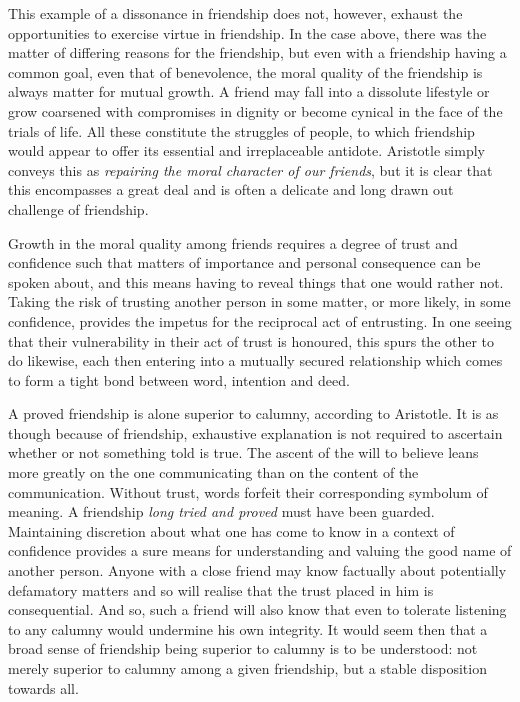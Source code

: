 \documentclass[a4paper,10pt]{article}
\begin{document}
This example of a dissonance in friendship does not, however, exhaust the opportunities to exercise virtue in friendship. In the case above, there was the matter of differing reasons for the friendship, but even with a friendship having a common goal, even that of benevolence, the moral quality of the friendship is always matter for mutual growth. A friend may fall into a dissolute lifestyle or grow coarsened with compromises in dignity or become cynical in the face of the trials of life. All these constitute the struggles of people, to which friendship would appear to offer its essential and irreplaceable antidote. Aristotle simply conveys this as \emph{repairing the moral character of our friends}, but it is clear that this encompasses a great deal and is often a delicate and long drawn out challenge of friendship.

Growth in the moral quality among friends requires a degree of trust and confidence such that matters of importance and personal consequence can be spoken about, and this means having to reveal things that one would rather not. Taking the risk of trusting another person in some matter, or more likely, in some confidence, provides the impetus for the reciprocal act of entrusting. In one seeing that their vulnerability in their act of trust is honoured, this spurs the other to do likewise, each then entering into a mutually secured relationship which comes to form a tight bond between word, intention and deed.

A proved friendship is alone superior to calumny, according to Aristotle. It is as though because of friendship, exhaustive explanation is not required to ascertain whether or not something told is true. The ascent of the will to believe leans more greatly on the one communicating than on the content of the communication. Without trust, words forfeit their corresponding symbolum of meaning. A friendship \emph{long tried and proved} must have been guarded. Maintaining discretion about what one has come to know in a context of confidence provides a sure means for understanding and valuing the good name of another person. Anyone with a close friend may know factually about potentially defamatory matters and so will realise that the trust placed in him is consequential. And so, such a friend will also know that even to tolerate listening to any calumny would undermine his own integrity. It would seem then that a broad sense of friendship being superior to calumny is to be understood: not merely superior to calumny among a given friendship, but a stable disposition towards all.
\end{document}
